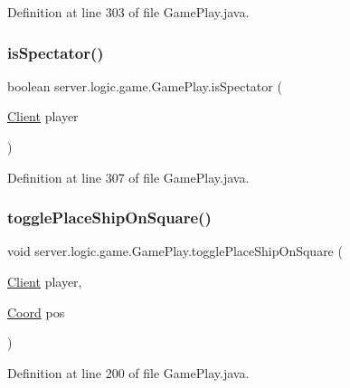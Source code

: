 Definition at line 303 of file Game\+Play.\+java.

\hypertarget{classserver_1_1logic_1_1game_1_1_game_play_a52b83e1a247f4c20456d88319e90c48c}{}\label{classserver_1_1logic_1_1game_1_1_game_play_a52b83e1a247f4c20456d88319e90c48c} 
\subsubsection{\texorpdfstring{is\+Spectator()}{isSpectator()}}
{\footnotesize\ttfamily boolean server.\+logic.\+game.\+Game\+Play.\+is\+Spectator (\begin{DoxyParamCaption}\item[{\hyperlink{classserver_1_1conn_1_1_client}{Client}}]{player }\end{DoxyParamCaption})}



Definition at line 307 of file Game\+Play.\+java.

\hypertarget{classserver_1_1logic_1_1game_1_1_game_play_a9f34dca51847af3cd06cc36cf8f101d5}{}\label{classserver_1_1logic_1_1game_1_1_game_play_a9f34dca51847af3cd06cc36cf8f101d5} 
\subsubsection{\texorpdfstring{toggle\+Place\+Ship\+On\+Square()}{togglePlaceShipOnSquare()}}
{\footnotesize\ttfamily void server.\+logic.\+game.\+Game\+Play.\+toggle\+Place\+Ship\+On\+Square (\begin{DoxyParamCaption}\item[{\hyperlink{classserver_1_1conn_1_1_client}{Client}}]{player,  }\item[{\hyperlink{classsharedlib_1_1utils_1_1_coord}{Coord}}]{pos }\end{DoxyParamCaption})}



Definition at line 200 of file Game\+Play.\+java.



